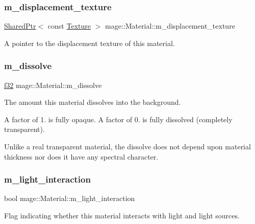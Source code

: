 \subsubsection{\texorpdfstring{m\+\_\+displacement\+\_\+texture}{m\_displacement\_texture}}
{\footnotesize\ttfamily \hyperlink{namespacemage_a1e01ae66713838a7a67d30e44c67703e}{Shared\+Ptr}$<$ const \hyperlink{classmage_1_1_texture}{Texture} $>$ mage\+::\+Material\+::m\+\_\+displacement\+\_\+texture\hspace{0.3cm}{\ttfamily [private]}}

A pointer to the displacement texture of this material. \hypertarget{structmage_1_1_material_a1a667115cdec8f1f4caf116ba9295c91}{}\label{structmage_1_1_material_a1a667115cdec8f1f4caf116ba9295c91} 
\subsubsection{\texorpdfstring{m\+\_\+dissolve}{m\_dissolve}}
{\footnotesize\ttfamily \hyperlink{namespacemage_a6a44ad388483959dc4dff9f2aef91431}{f32} mage\+::\+Material\+::m\+\_\+dissolve\hspace{0.3cm}{\ttfamily [private]}}

The amount this material dissolves into the background.

A factor of 1. is fully opaque. A factor of 0. is fully dissolved (completely transparent).

Unlike a real transparent material, the dissolve does not depend upon material thickness nor does it have any spectral character. \hypertarget{structmage_1_1_material_a636ddbd882e3ff2841c192c5ecbc5053}{}\label{structmage_1_1_material_a636ddbd882e3ff2841c192c5ecbc5053} 
\subsubsection{\texorpdfstring{m\+\_\+light\+\_\+interaction}{m\_light\_interaction}}
{\footnotesize\ttfamily bool mage\+::\+Material\+::m\+\_\+light\+\_\+interaction\hspace{0.3cm}{\ttfamily [private]}}

Flag indicating whether this material interacts with light and light sources. \hypertarget{structmage_1_1_material_a4101aba9cbc86430efe6ed3bf48eeab1}{}\label{structmage_1_1_material_a4101aba9cbc86430efe6ed3bf48eeab1} 
